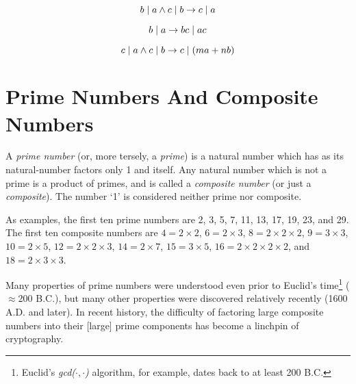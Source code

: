 \begin{equation}
b \mid a \wedge c \mid b \to c \mid a
\end{equation}

\begin{equation}
b \mid a \to b c \mid a c
\end{equation}

\begin{equation}
c \mid a \wedge c \mid b \to c \mid (m a + n b)
\end{equation}


\section{Prime Numbers And Composite Numbers}
\label{cpri0:pnc0}

A \emph{prime number} (or, more tersely, a \emph{prime})
is a natural number
which has as its natural-number factors only 1 and itself.
Any natural number which is not a prime is a product of primes, and is called
a \emph{composite number} (or just a \emph{composite}).
The number `1' is considered neither prime nor composite.

As examples, the first ten prime numbers are 2, 3, 5, 7, 11,
13, 17, 19, 23, and 29.  The first ten composite numbers are
$4 = 2 \times 2$,
$6 = 2 \times 3$,
$8 = 2 \times 2 \times 2$,
$9 = 3 \times 3$,
$10 = 2 \times 5$,
$12 = 2 \times 2 \times 3$,
$14 = 2 \times 7$,
$15 = 3 \times 5$,
$16 = 2 \times 2 \times 2 \times 2$,
and $18 = 2 \times 3 \times 3$.

Many properties of prime numbers were understood even prior
to Euclid's time\footnote{Euclid's \emph{gcd($\cdot{},\cdot{}$)} algorithm, for example,
dates back to at least 200 B.C.} ($\approx$200 B.C.), but many other properties
were discovered relatively recently (1600 A.D. and later).  In recent history,
the difficulty of factoring large composite numbers into their [large] prime
components has become a linchpin of cryptography.


